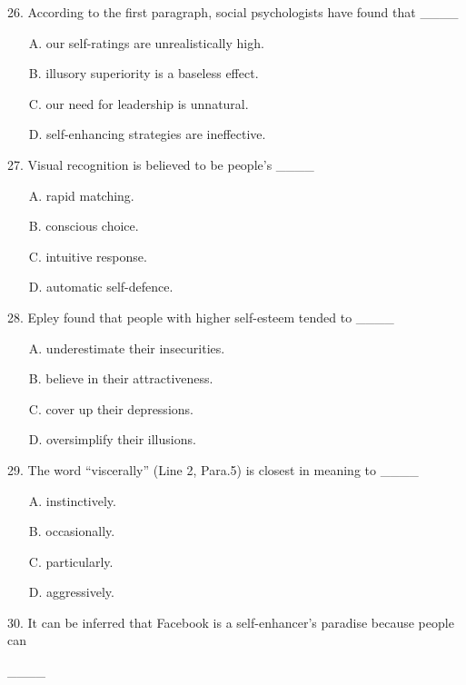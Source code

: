 \documentclass[UTF8,11pt]{ctexart}
\begin{document}
26. According to the first paragraph, social psychologists have found that \_\_\_\_


\begin{itemize}[leftmargin=2em,itemsep=.2em,topsep=.4em]\item[A.] our self-ratings are unrealistically high.
\item[B.] illusory superiority is a baseless effect.
\item[C.] our need for leadership is unnatural.
\item[D.] self-enhancing strategies are ineffective.
\end{itemize}

27. Visual recognition is believed to be people’s \_\_\_\_


\begin{itemize}[leftmargin=2em,itemsep=.2em,topsep=.4em]\item[A.] rapid matching.
\item[B.] conscious choice.
\item[C.] intuitive response.
\item[D.] automatic self-defence.
\end{itemize}

28. Epley found that people with higher self-esteem tended to \_\_\_\_


\begin{itemize}[leftmargin=2em,itemsep=.2em,topsep=.4em]\item[A.] underestimate their insecurities.
\item[B.] believe in their attractiveness.
\item[C.] cover up their depressions.
\item[D.] oversimplify their illusions.
\end{itemize}

29. The word “viscerally” (Line 2, Para.5) is closest in meaning to \_\_\_\_


\begin{itemize}[leftmargin=2em,itemsep=.2em,topsep=.4em]\item[A.] instinctively.
\item[B.] occasionally.
\item[C.] particularly.
\item[D.] aggressively.
\end{itemize}

30. It can be inferred that Facebook is a self-enhancer’s paradise because people can


\_\_\_\_
\end{document}

